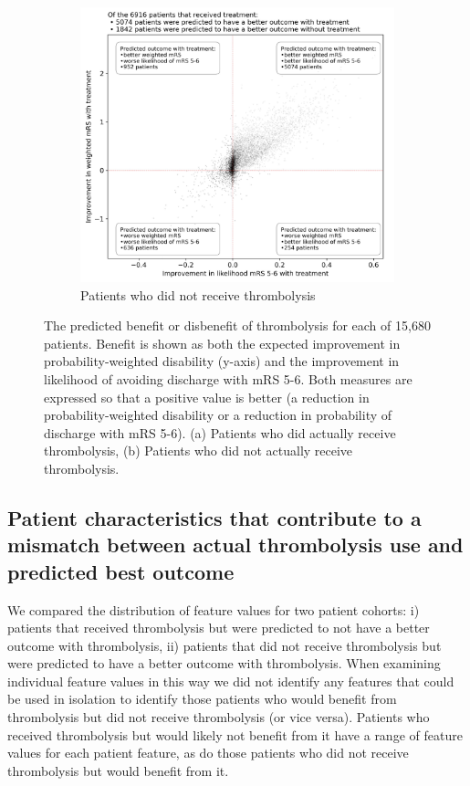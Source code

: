 \begin{figure}
\begin{subfigure}{.7\textwidth}
  \centering
  \captionsetup{width=.9\linewidth}
  \includegraphics[trim={0 0 0 1.7cm}, clip, width=1\linewidth]{./images/p4_scatter_treated}
  \caption{\footnotesize{Patients who did not receive thrombolysis}}
  \label{fig:scatter_not_receive}
\end{subfigure}
  \caption{The predicted benefit or disbenefit of thrombolysis for each of 15,680 patients. Benefit is shown as both the expected improvement in probability-weighted disability (y-axis) and the improvement in likelihood of avoiding discharge with mRS 5-6. Both measures are expressed so that a positive value is better (a reduction in probability-weighted disability or a reduction in probability of discharge with mRS 5-6). (a) Patients who did actually receive thrombolysis, (b) Patients who did not actually receive thrombolysis.}
\label{fig:scatter_all}
\end{figure}

\subsection{Patient characteristics that contribute to a mismatch between actual thrombolysis use and predicted best outcome}

We compared the distribution of feature values for two patient cohorts: i) patients that received thrombolysis but were predicted to not have a better outcome with thrombolysis, ii) patients that did not receive thrombolysis but were predicted to have a better outcome with thrombolysis. When examining individual feature values in this way we did not identify any features that could be used in isolation to identify those patients who would benefit from thrombolysis but did not receive thrombolysis (or vice versa). Patients who received thrombolysis but would likely not benefit from it have a range of feature values for each patient feature, as do those patients who did not receive thrombolysis but would benefit from it.

